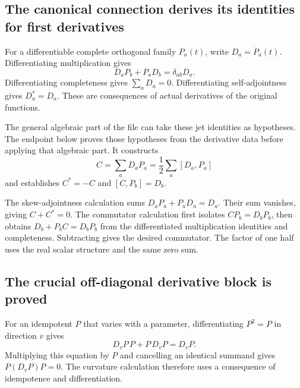 \subsection{The canonical connection derives its identities for first derivatives}
For a differentiable complete orthogonal family $P_a(t)$, write $D_a=\dot P_a(t)$. Differentiating multiplication gives
\[
D_aP_b+P_aD_b=\delta_{ab}D_a.
\]
Differentiating completeness gives $\sum_aD_a=0$. Differentiating self-adjointness gives $D_a^*=D_a$. These are consequences of actual derivatives of the original functions.


The general algebraic part of the file can take these jet identities as hypotheses. The endpoint below proves those hypotheses from the derivative data before applying that algebraic part. It constructs
\[
C=\sum_aD_aP_a=\frac12\sum_a[D_a,P_a]
\]
and establishes $C^*=-C$ and $[C,P_b]=D_b$.



The skew-adjointness calculation sums $D_aP_a+P_aD_a=D_a$. Their sum vanishes, giving $C+C^*=0$. The commutator calculation first isolates $CP_b=D_bP_b$, then obtains $D_b+P_bC=D_bP_b$ from the differentiated multiplication identities and completeness. Subtracting gives the desired commutator. The factor of one half uses the real scalar structure and the same zero sum.

\subsection{The crucial off-diagonal derivative block is proved}
For an idempotent $P$ that varies with a parameter, differentiating $P^2=P$ in direction $v$ gives
\[
D_vP\,P+P\,D_vP=D_vP.
\]
Multiplying this equation by $P$ and cancelling an identical summand gives $P(D_vP)P=0$. The curvature calculation therefore uses a consequence of idempotence and differentiation.


